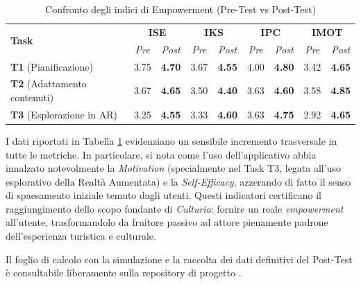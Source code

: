 \begin{table}[h]
    \centering
    \begin{tabular}{l | cc | cc | cc | cc}
        \toprule
        \multirow{2}{*}{\textbf{Task}} & \multicolumn{2}{c}{\textbf{ISE}} & \multicolumn{2}{c}{\textbf{IKS}} & \multicolumn{2}{c}{\textbf{IPC}} & \multicolumn{2}{c}{\textbf{IMOT}} \\
        & \textit{Pre} & \textit{Post} & \textit{Pre} & \textit{Post} & \textit{Pre} & \textit{Post} & \textit{Pre} & \textit{Post} \\
        \midrule
        \textbf{T1} (Pianificazione) & 3.75 & \textbf{4.70} & 3.67 & \textbf{4.55} & 4.00 & \textbf{4.80} & 3.42 & \textbf{4.65} \\
        \textbf{T2} (Adattamento contenuti) & 3.67 & \textbf{4.65} & 3.50 & \textbf{4.40} & 3.63 & \textbf{4.60} & 3.58 & \textbf{4.85} \\
        \textbf{T3} (Esplorazione in AR) & 3.25 & \textbf{4.55} & 3.33 & \textbf{4.60} & 3.63 & \textbf{4.75} & 2.92 & \textbf{4.65} \\
        \bottomrule
    \end{tabular}
    \caption{Confronto degli indici di Empowerment (Pre-Test vs Post-Test)}
    \label{tab:empowerment}
\end{table}

I dati riportati in Tabella \ref{tab:empowerment} evidenziano un sensibile incremento trasversale in tutte le metriche. In particolare, si nota come l'uso dell'applicativo abbia innalzato notevolmente la \textit{Motivation} (specialmente nel Task T3, legata all'uso esplorativo della Realtà Aumentata) e la \textit{Self-Efficacy}, azzerando di fatto il senso di spaesamento iniziale temuto dagli utenti. Questi indicatori certificano il raggiungimento dello scopo fondante di \textit{Culturia}: fornire un reale \textit{empowerment} all'utente, trasformandolo da fruitore passivo ad attore pienamente padrone dell'esperienza turistica e culturale.

Il foglio di calcolo con la simulazione e la raccolta dei dati definitivi del Post-Test è consultabile liberamente sulla repository di progetto \cite{empowerment_post_test}.
